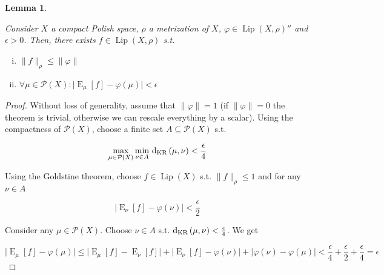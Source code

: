 \documentclass[11pt]{article}
\theoremstyle{definition}
\theoremstyle{plain}
\newtheorem{lemma}{Lemma}%
\newcommand{\A}[1]{\lvert #1 \rvert}
\newcommand{\N}[1]{\lVert #1 \rVert}
\DeclareMathOperator{\E}{E}
\newcommand{\PM}{\mathcal{P}}
\newcommand{\Lp}{{\operatorname{Lip}}}
\newcommand{\DKR}{\operatorname{d}_{\textnormal{KR}}}
\begin{document}
\begin{samepage}
\begin{lemma}
\label{lmm:double_dual}

Consider $X$ a compact Polish space, $\rho$ a metrization of $X$, $\varphi \in \Lp\left(X,\rho\right)''$ and $\epsilon > 0$. Then, there exists $f \in \Lp\left(X,\rho\right)$ s.t.

\begin{enumerate}[i.]

\item $\N{f}_\rho \leq \N{\varphi}$
\item $\forall \mu \in \PM\left(X\right): \A{\E_\mu\left[f\right] - \varphi\left(\mu\right)} < \epsilon$

\end{enumerate}

\end{lemma}
\end{samepage}

\begin{proof}

Without loss of generality, assume that $\N{\varphi}=1$ (if $\N{\varphi}=0$ the theorem is trivial, otherwise we can rescale everything by a scalar). Using the compactness of $\PM\left(X\right)$, choose a finite set $A \subseteq \PM\left(X\right)$ s.t. 

$$\max_{\mu \in \PM\left(X\right)} \min_{\nu \in A}\, \DKR\left(\mu,\nu\right) < \frac{\epsilon}{4}$$

Using the Goldstine theorem, choose $f \in \Lp\left(X\right)$ s.t. $\N{f}_\rho \leq 1$ and for any $\nu \in A$ 

$$\A{\E_\nu\left[f\right] - \varphi\left(\nu\right)} < \frac{\epsilon}{2}$$

Consider any $\mu \in \PM\left(X\right)$. Choose $\nu \in A$ s.t. $\DKR\left(\mu,\nu\right) < \frac{\epsilon}{4}$. We get

$$\A{\E_\mu\left[f\right] - \varphi\left(\mu\right)} \leq \A{\E_\mu\left[f\right] - \E_\nu\left[f\right]} + \A{\E_\nu\left[f\right] - \varphi\left(\nu\right)} + \A{\varphi\left(\nu\right) - \varphi\left(\mu\right)} < \frac{\epsilon}{4} + \frac{\epsilon}{2} + \frac{\epsilon}{4} = \epsilon$$
\end{proof}
\end{document}
